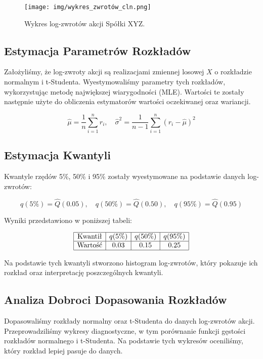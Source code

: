 \documentclass[a4paper,12pt]{article}
\begin{document}
\begin{figure}[h!]
\centering
\texttt{[image: img/wykres\_zwrotów\_cln.png]}
\caption{Wykres log-zwrotów akcji Spółki XYZ.}
\end{figure}

\subsection{Estymacja Parametrów Rozkładów}
Założyliśmy, że log-zwroty akcji są realizacjami zmiennej losowej \( X \) o rozkładzie normalnym i t-Studenta. Wyestymowaliśmy parametry tych rozkładów, wykorzystując metodę największej wiarygodności (MLE). Wartości te zostały następnie użyte do obliczenia estymatorów wartości oczekiwanej oraz wariancji.

\[
\hat{\mu} = \frac{1}{n} \sum_{i=1}^{n} r_i, \quad \hat{\sigma}^2 = \frac{1}{n-1} \sum_{i=1}^{n} (r_i - \hat{\mu})^2
\]

\subsection{Estymacja Kwantyli}
Kwantyle rzędów 5\%, 50\% i 95\% zostały wyestymowane na podstawie danych log-zwrotów:

\[
q(5\%) = \hat{Q}(0.05), \quad q(50\%) = \hat{Q}(0.50), \quad q(95\%) = \hat{Q}(0.95)
\]

Wyniki przedstawiono w poniższej tabeli:

\[
\begin{array}{|c|c|c|c|}
\hline
\text{Kwantił} & q(5\%) & q(50\%) & q(95\%) \\
\hline
\text{Wartość} & 0.03 & 0.15 & 0.25 \\
\hline
\end{array}
\]

Na podstawie tych kwantyli stworzono histogram log-zwrotów, który pokazuje ich rozkład oraz interpretację poszczególnych kwantyli.

\subsection{Analiza Dobroci Dopasowania Rozkładów}
Dopasowaliśmy rozkłady normalny oraz t-Studenta do danych log-zwrotów akcji. Przeprowadziliśmy wykresy diagnostyczne, w tym porównanie funkcji gęstości rozkładów normalnego i t-Studenta. Na podstawie tych wykresów oceniliśmy, który rozkład lepiej pasuje do danych.
\end{document}
